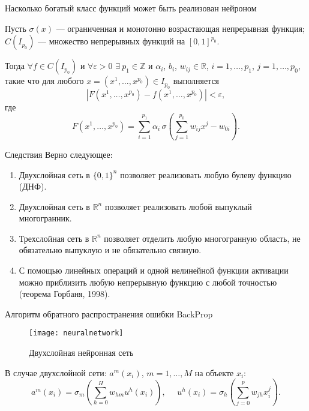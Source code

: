 \documentclass[11pt]{beamer}
\begin{document}
	\begin{frame}{Насколько богатый класс функций может быть реализован нейроном}
		\begin{theorem}[Цыбенко, 1989]
			Пусть $\sigma(x)$ --- ограниченная и монотонно возрастающая непрерывная функция; $C(I_{p_0})$ --- множество непрерывных функций на $[0,1]^{p_0}$.
			
			Тогда $\forall f \in C(I_{p_0})$ и $\forall \varepsilon > 0$  $\exists ~p_1 \in \mathbb{Z}$ и  $\alpha_i$, $b_i$, $w_{ij} \in \mathbb{R}$, $i=1,\ldots,p_1$, $j=1,\ldots, p_0$, такие что для любого $x=(x^1, \ldots, x^{p_0}) \in I_{p_0}$ выполняется
			\begin{equation*}
				| F(x^1, \ldots, x^{p_0}) - f(x^1, \ldots, x^{p_0})| < \varepsilon,
			\end{equation*}
			где  \begin{equation*}
				F(x^1, \ldots, x^{p_0})=\sum_{i=1}^{p_1} \alpha_i \, \sigma \left(\sum_{j=1}^{p_0} w_{ij} x^j -w_{0i}   \right).
			\end{equation*}
		\end{theorem}	
	\end{frame}

	\begin{frame}{Следствия}
			Верно следующее:
		\begin{enumerate} 
			\item Двухслойная сеть в $\{0,1\}^n$ позволяет реализовать любую булеву функцию (ДНФ). 
			\item Двухслойная сеть в $\mathbb{R}^n$ позволяет реализовать любой выпуклый многогранник. 
			\item Трехслойная сеть в $\mathbb{R}^n$ позволяет отделить любую многогранную область, не обязательно выпуклую и не обязательно связную. 
			\item С помощью линейных операций и одной нелинейной функции активации можно приблизить любую непрерывную функцию с любой точностью (теорема Горбаня, 1998). 
		\end{enumerate}
	\end{frame}

	\begin{frame}{Алгоритм обратного распространения ошибки BackProp}
		\begin{figure}[H]
			\begin{center}
					\texttt{[image: neuralnetwork]}
					\caption{Двухслойная нейронная сеть}
					\label{neuralnetwork}
			\end{center}
		\end{figure}
	В случае двухслойной сети: $a^m(x_i)$, $m=1,\ldots,M$ на объекте $x_i$:
	\begin{equation*}
		a^m(x_i) = \sigma_m \left(\sum_{h=0}^{H} w_{hm}  u^h(x_i)  \right), ~~~~~~
		u^h(x_i) = \sigma_h \left(\sum_{j=0}^{p} w_{jh} x_{i}^j   \right).
	\end{equation*}
	\end{frame}
	
\end{document}

